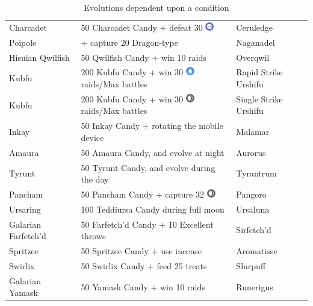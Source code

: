 \begin{table}
\begin{tabular}{lll}
  Charcadet	& 50 Charcadet Candy + defeat 30 \includegraphics[width=1em,height=1em]{images/ghost.png}& Ceruledge\\
  Poipole & + capture 20 Dragon-type & Naganadel\\
  Hisuian Qwilfish & 50 Qwilfish Candy + win 10 raids & Overqwil\\
  Kubfu	& 200 Kubfu Candy + win 30 \includegraphics[width=1em,height=1em]{images/water.png} raids/Max battles & Rapid Strike Urshifu\\
  Kubfu	& 200 Kubfu Candy + win 30 \includegraphics[width=1em,height=1em]{images/dark.png} raids/Max battles & Single Strike Urshifu\\
  Inkay	& 50 Inkay Candy + rotating the mobile device & Malamar\\
  Amaura & 50 Amaura Candy, and evolve at night & Aurorus\\
  Tyrunt & 50 Tyrunt Candy, and evolve during the day & Tyrantrum\\
  Pancham	& 50 Pancham Candy + capture 32 \includegraphics[width=1em,height=1em]{images/dark.png} & Pangoro\\
  Ursaring & 100 Teddiursa Candy during full moon & Ursaluna\\ 
  Galarian Farfetch'd & 50 Farfetch'd Candy + 10 Excellent throws & Sirfetch'd \\
  Spritzee & 50 Spritzee Candy + use incense & Aromatisse\\
  Swirlix & 50 Swirlix Candy + feed 25 treats & Slurpuff\\
  Galarian Yamask & 50 Yamask Candy + win 10 raids & Runerigus\\
\end{tabular}
\caption{Evolutions dependent upon a condition}
\label{table:condevolutions}
\end{table}
